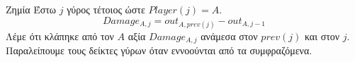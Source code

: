 {}
\begin{definitiongr}{Ζημία}
  Έστω $j$ γύρος τέτοιος ώστε $Player\left(j\right) = A$.
  \begin{equation}
    Damage_{A, j} = out_{A, prev\left(j\right)} - out_{A, j-1}
  \end{equation}
  Λέμε ότι κλάπηκε από τον $A$ αξία $Damage_{A, j}$ ανάμεσα στον $prev\left(j\right)$ και στον $j$. Παραλείπουμε τους δείκτες
  γύρων όταν εννοούνται από τα συμφραζόμενα.
\end{definitiongr}
